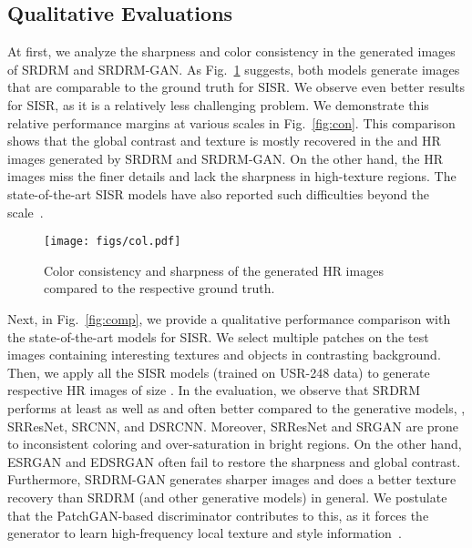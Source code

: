 \documentclass[10pt,twocolumn,letterpaper]{article}
\begin{document}
\subsection{Qualitative Evaluations}
At first, we analyze the sharpness and color consistency in the generated images of SRDRM and SRDRM-GAN. As Fig.~\ref{fig:col} suggests, both models generate images that are comparable to the ground truth for  SISR. We observe even better results for  SISR, as it is a relatively less challenging problem. We demonstrate this relative performance margins at various scales in Fig.~\ref{fig:con}. This comparison shows that the global contrast and texture is mostly recovered in the  and  HR images generated by SRDRM and SRDRM-GAN. On the other hand, the  HR images miss the finer details and lack the sharpness in high-texture regions. The state-of-the-art SISR models have also reported such difficulties beyond the  scale~\cite{yang2019deep}. 

\begin{figure}[b]
\vspace{-2mm}
    \centering
    \texttt{[image: figs/col.pdf]}
    \vspace{-1mm}
    \caption{Color consistency and sharpness of the generated  HR images compared to the respective ground truth.}
    \label{fig:col}
\end{figure}

Next, in Fig.~\ref{fig:comp}, we provide a qualitative performance comparison with the state-of-the-art models for  SISR. 
We select multiple  patches on the test images containing interesting textures and objects in contrasting background. Then, we apply all the SISR models (trained on  USR-248 data) to generate respective HR images of size .      
In the evaluation, we observe that SRDRM performs at least as well as and often better compared to the generative models, \ie, SRResNet, SRCNN, and DSRCNN. Moreover, SRResNet and SRGAN are prone to inconsistent coloring and over-saturation in bright regions. 
On the other hand, ESRGAN and EDSRGAN often fail to restore the sharpness and global contrast. 
Furthermore, SRDRM-GAN generates sharper images and does a better texture recovery than SRDRM (and other generative models) in general. We postulate that the PatchGAN-based discriminator contributes to this, as it forces the generator to learn high-frequency local texture and style information~\cite{isola2017image}. 
\end{document}
